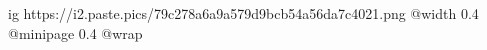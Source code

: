  
 
 
 
 

\ifcmt
  ig https://i2.paste.pics/79c278a6a9a579d9bcb54a56da7c4021.png
  @width 0.4
  @minipage 0.4
  @wrap \parpic[r]
\fi
